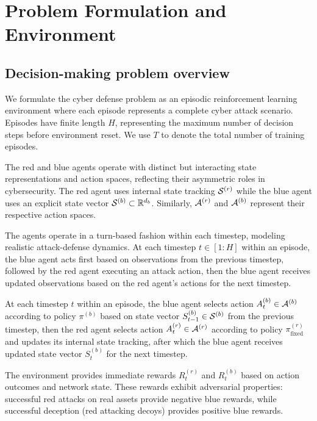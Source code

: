\documentclass[12pt,oneside]{article}
\begin{document}
\clearpage
\section{Problem Formulation and Environment}

\subsection{Decision-making problem overview}

We formulate the cyber defense problem as an episodic reinforcement learning environment where each episode represents a complete cyber attack scenario. Episodes have finite length $H$, representing the maximum number of decision steps before environment reset. We use $T$ to denote the total number of training episodes.

The red and blue agents operate with distinct but interacting state representations and action spaces, reflecting their asymmetric roles in cybersecurity. The red agent uses internal state tracking $\mathcal{S}^{(r)}$ while the blue agent uses an explicit state vector $\mathcal{S}^{(b)} \subset \mathbb{R}^{d_b}$. Similarly, $\mathcal{A}^{(r)}$ and $\mathcal{A}^{(b)}$ represent their respective action spaces.

The agents operate in a turn-based fashion within each timestep, modeling realistic attack-defense dynamics. At each timestep $t \in [1:H]$ within an episode, the blue agent acts first based on observations from the previous timestep, followed by the red agent executing an attack action, then the blue agent receives updated observations based on the red agent's actions for the next timestep.

At each timestep $t$ within an episode, the blue agent selects action $A_t^{(b)} \in \mathcal{A}^{(b)}$ according to policy $\pi^{(b)}$ based on state vector $S_{t-1}^{(b)} \in \mathcal{S}^{(b)}$ from the previous timestep, then the red agent selects action $A_t^{(r)} \in \mathcal{A}^{(r)}$ according to policy $\pi^{(r)}_{\text{fixed}}$ and updates its internal state tracking, after which the blue agent receives updated state vector $S_t^{(b)}$ for the next timestep.

The environment provides immediate rewards $R_t^{(r)}$ and $R_t^{(b)}$ based on action outcomes and network state. These rewards exhibit adversarial properties: successful red attacks on real assets provide negative blue rewards, while successful deception (red attacking decoys) provides positive blue rewards.
\end{document}
